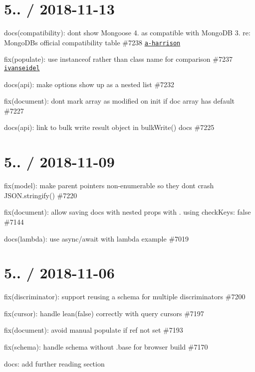 \section*{5.. / 2018-\/11-\/13 }


\begin{DoxyItemize}
\item docs(compatibility)\+: don\textquotesingle{}t show Mongoose 4. as compatible with Mongo\+DB 3. re\+: Mongo\+DB\textquotesingle{}s official compatibility table \#7238 \href{https://github.com/a-harrison}{\tt a-\/harrison}
\item fix(populate)\+: use {\ttfamily instanceof} rather than class name for comparison \#7237 \href{https://github.com/ivanseidel}{\tt ivanseidel}
\item docs(api)\+: make options show up as a nested list \#7232
\item fix(document)\+: don\textquotesingle{}t mark array as modified on init if doc array has default \#7227
\item docs(api)\+: link to bulk write result object in {\ttfamily bulk\+Write()} docs \#7225
\end{DoxyItemize}

\section*{5.. / 2018-\/11-\/09 }


\begin{DoxyItemize}
\item fix(model)\+: make parent pointers non-\/enumerable so they don\textquotesingle{}t crash J\+S\+O\+N.\+stringify() \#7220
\item fix(document)\+: allow saving docs with nested props with \textquotesingle{}.\textquotesingle{} using {\ttfamily check\+Keys\+: false} \#7144
\item docs(lambda)\+: use async/await with lambda example \#7019
\end{DoxyItemize}

\section*{5.. / 2018-\/11-\/06 }


\begin{DoxyItemize}
\item fix(discriminator)\+: support reusing a schema for multiple discriminators \#7200
\item fix(cursor)\+: handle {\ttfamily lean(false)} correctly with query cursors \#7197
\item fix(document)\+: avoid manual populate if {\ttfamily ref} not set \#7193
\item fix(schema)\+: handle schema without {\ttfamily .base} for browser build \#7170
\item docs\+: add further reading section
\end{DoxyItemize}

